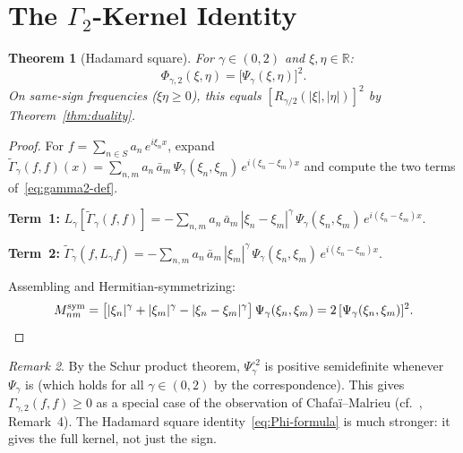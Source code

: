 \documentclass[11pt,a4paper]{article}
\theoremstyle{plain}
\newtheorem{theorem}{Theorem}[section]
\theoremstyle{definition}
\theoremstyle{remark}
\newtheorem{remark}[theorem]{Remark}
\newcommand{\R}{\mathbb{R}}
\begin{document}
\section{The $\Gamma_2$-Kernel Identity}\label{sec:gamma2}

\begin{theorem}[Hadamard square]\label{thm:gamma2-kernel}
For $\gamma \in (0,2)$ and $\xi,\eta \in \R$:
\begin{equation}\label{eq:Phi-formula}
  \Phi_{\gamma,2}(\xi,\eta) = \bigl[\Psi_\gamma(\xi,\eta)\bigr]^2.
\end{equation}
On same-sign frequencies ($\xi\eta \geq 0$), this equals
$[R_{\gamma/2}(|\xi|,|\eta|)]^2$ by
Theorem~\ref{thm:duality}.
\end{theorem}

\begin{proof}
For $f = \sum_{n \in S} a_n\,e^{i\xi_n x}$, expand
$\widetilde{\Gamma}_\gamma(f,f)(x)
= \sum_{n,m} a_n\,\bar{a}_m\,\Psi_\gamma(\xi_n,\xi_m)\,
  e^{i(\xi_n-\xi_m)x}$
and compute the two terms of~\eqref{eq:gamma2-def}.

\textbf{Term~1:}
$L_\gamma[\widetilde{\Gamma}_\gamma(f,f)] =
-\sum_{n,m} a_n\,\bar{a}_m\,|\xi_n-\xi_m|^\gamma\,
\Psi_\gamma(\xi_n,\xi_m)\,e^{i(\xi_n-\xi_m)x}$.

\textbf{Term~2:}
$\widetilde{\Gamma}_\gamma(f, L_\gamma f) =
-\sum_{n,m} a_n\,\bar{a}_m\,|\xi_m|^\gamma\,
\Psi_\gamma(\xi_n,\xi_m)\,e^{i(\xi_n-\xi_m)x}$.

Assembling and Hermitian-symmetrizing:
\[
  M_{nm}^{\mathrm{sym}}
  = \bigl[|\xi_n|^\gamma + |\xi_m|^\gamma - |\xi_n-\xi_m|^\gamma\bigr]\,
  \Psi_\gamma(\xi_n,\xi_m)
  = 2\,[\Psi_\gamma(\xi_n,\xi_m)]^2. \qedhere
\]
\end{proof}

\begin{remark}\label{rem:hadamard}
By the Schur product theorem, $\Psi_\gamma^{\circ 2}$ is positive
semidefinite whenever $\Psi_\gamma$ is (which holds for all
$\gamma \in (0,2)$ by the correspondence). This gives $\Gamma_{\gamma,2}(f,f) \geq 0$
as a special case of the observation of Chafa\"i--Malrieu
(cf.~\cite{GentilImbert2008}, Remark~4). The Hadamard square
identity~\eqref{eq:Phi-formula} is much stronger: it gives the
full kernel, not just the sign.
\end{remark}


\end{document}
